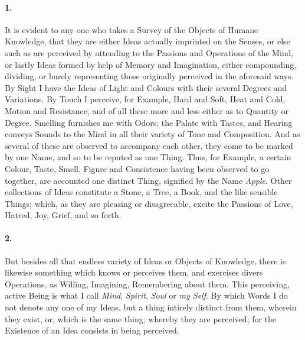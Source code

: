 \documentclass[]{article}
\newenvironment{sectionbody}{\begin{multicols}{2}}{\end{multicols}}
\begin{document}
\begin{sectionbody}

\paragraph{1.} It is evident to any one who takes a Survey of the Objects of
Humane Knowledge, that they are either Ideas actually imprinted
on the Senses, or else such as are perceived by attending to the
Passions and Operations of the Mind, or lastly Ideas formed by
help of Memory and Imagination, either compounding, dividing, or
barely representing those originally perceived in the aforesaid
ways.  By Sight I have the Ideas of Light and Colours with their
several Degrees and Variations.  By Touch I perceive, for
Example, Hard and Soft, Heat and Cold, Motion and Resistance, and
of all these more and less either as to Quantity or Degree.
Smelling furnishes me with Odors; the Palate with Tastes, and
Hearing conveys Sounds to the Mind in all their variety of Tone
and Composition.  And as several of these are observed to
accompany each other, they come to be marked by one Name, and so
to be reputed as one Thing.  Thus, for Example, a certain Colour,
Taste, Smell, Figure and Consistence having been observed to go
together, are accounted one distinct Thing, signified by the Name
\emph{Apple}.  Other collections of Ideas constitute a Stone, a
Tree, a Book, and the like sensible Things; which, as they are
pleasing or disagreeable, excite the Passions of Love, Hatred,
Joy, Grief, and so forth.



\paragraph{2.} But besides all that endless variety of Ideas or Objects of
Knowledge, there is likewise something which knows or perceives
them, and exercises divers Operations, as Willing, Imagining,
Remembering about them.  This perceiving, active Being is what I
call \emph{Mind}, \emph{Spirit}, \emph{Soul} or \emph{my
Self}.  By which Words I do not denote any one of my Ideas,
but a thing intirely distinct from them, wherein they exist, or,
which is the same thing, whereby they are perceived; for the
Existence of an Idea consists in being perceived.




\end{sectionbody}
\end{document}
